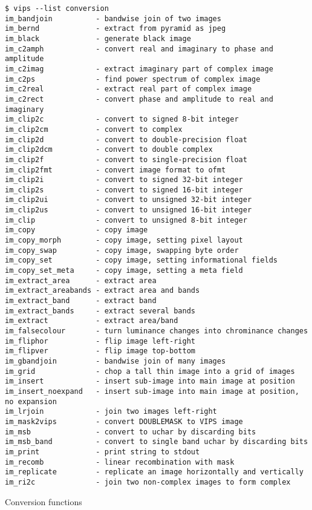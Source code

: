 \begin{fig2}
\begin{verbatim}
$ vips --list conversion
im_bandjoin          - bandwise join of two images
im_bernd             - extract from pyramid as jpeg
im_black             - generate black image
im_c2amph            - convert real and imaginary to phase and amplitude
im_c2imag            - extract imaginary part of complex image
im_c2ps              - find power spectrum of complex image
im_c2real            - extract real part of complex image
im_c2rect            - convert phase and amplitude to real and imaginary
im_clip2c            - convert to signed 8-bit integer
im_clip2cm           - convert to complex
im_clip2d            - convert to double-precision float
im_clip2dcm          - convert to double complex
im_clip2f            - convert to single-precision float
im_clip2fmt          - convert image format to ofmt
im_clip2i            - convert to signed 32-bit integer
im_clip2s            - convert to signed 16-bit integer
im_clip2ui           - convert to unsigned 32-bit integer
im_clip2us           - convert to unsigned 16-bit integer
im_clip              - convert to unsigned 8-bit integer
im_copy              - copy image
im_copy_morph        - copy image, setting pixel layout
im_copy_swap         - copy image, swapping byte order
im_copy_set          - copy image, setting informational fields
im_copy_set_meta     - copy image, setting a meta field
im_extract_area      - extract area
im_extract_areabands - extract area and bands
im_extract_band      - extract band
im_extract_bands     - extract several bands
im_extract           - extract area/band
im_falsecolour       - turn luminance changes into chrominance changes
im_fliphor           - flip image left-right
im_flipver           - flip image top-bottom
im_gbandjoin         - bandwise join of many images
im_grid              - chop a tall thin image into a grid of images
im_insert            - insert sub-image into main image at position
im_insert_noexpand   - insert sub-image into main image at position, no expansion
im_lrjoin            - join two images left-right
im_mask2vips         - convert DOUBLEMASK to VIPS image
im_msb               - convert to uchar by discarding bits
im_msb_band          - convert to single band uchar by discarding bits
im_print             - print string to stdout
im_recomb            - linear recombination with mask
im_replicate         - replicate an image horizontally and vertically
im_ri2c              - join two non-complex images to form complex
\end{verbatim}
\caption{Conversion functions}
\label{fg:conversion}
\end{fig2}

